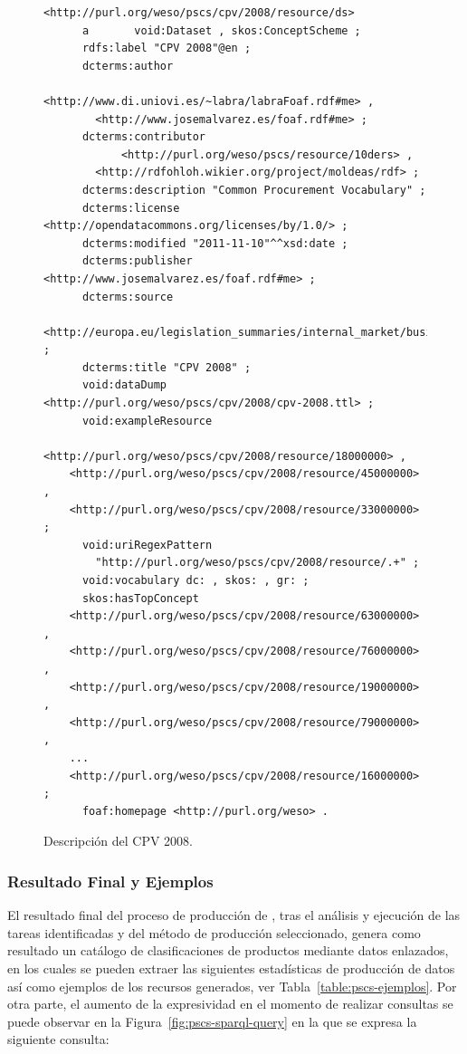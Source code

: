 \begin{figure}[!htp]
\begin{lstlisting} 
<http://purl.org/weso/pscs/cpv/2008/resource/ds>
      a       void:Dataset , skos:ConceptScheme ;
      rdfs:label "CPV 2008"@en ;
      dcterms:author 
            <http://www.di.uniovi.es/~labra/labraFoaf.rdf#me> , 
	    <http://www.josemalvarez.es/foaf.rdf#me> ;
      dcterms:contributor
            <http://purl.org/weso/pscs/resource/10ders> ,
	    <http://rdfohloh.wikier.org/project/moldeas/rdf> ;
      dcterms:description "Common Procurement Vocabulary" ;
      dcterms:license <http://opendatacommons.org/licenses/by/1.0/> ;
      dcterms:modified "2011-11-10"^^xsd:date ;
      dcterms:publisher <http://www.josemalvarez.es/foaf.rdf#me> ;
      dcterms:source 
	<http://europa.eu/legislation_summaries/internal_market/businesses/public_procurement/l22008_en.htm> ;
      dcterms:title "CPV 2008" ;
      void:dataDump <http://purl.org/weso/pscs/cpv/2008/cpv-2008.ttl> ;
      void:exampleResource
        <http://purl.org/weso/pscs/cpv/2008/resource/18000000> , 
	<http://purl.org/weso/pscs/cpv/2008/resource/45000000> , 
	<http://purl.org/weso/pscs/cpv/2008/resource/33000000> ;
      void:uriRegexPattern
        "http://purl.org/weso/pscs/cpv/2008/resource/.+" ;
      void:vocabulary dc: , skos: , gr: ;
      skos:hasTopConcept 
	<http://purl.org/weso/pscs/cpv/2008/resource/63000000> ,
	<http://purl.org/weso/pscs/cpv/2008/resource/76000000> , 
	<http://purl.org/weso/pscs/cpv/2008/resource/19000000> , 
	<http://purl.org/weso/pscs/cpv/2008/resource/79000000> , 	
	...
	<http://purl.org/weso/pscs/cpv/2008/resource/16000000> ;
      foaf:homepage <http://purl.org/weso> .
\end{lstlisting}
	\caption{Descripción del \dataset CPV 2008.}
	\label{fig:pscs-ds-cpv-2008}
\end{figure}
\clearpage
\subsubsection{Resultado Final y Ejemplos}\label{resultado-pscs}
El resultado final del proceso de producción de \linkeddata, tras el análisis y ejecución 
de las tareas identificadas y del método de producción seleccionado, genera como resultado un catálogo 
de clasificaciones de productos mediante datos enlazados, en los cuales se pueden extraer las siguientes 
estadísticas de producción de datos así como ejemplos de los recursos generados, ver Tabla~\ref{table:pscs-ejemplos}. Por otra parte, 
el aumento de la expresividad en el momento de realizar consultas se puede observar en la Figura~\ref{fig:pscs-sparql-query} en la 
que se expresa la siguiente consulta:

